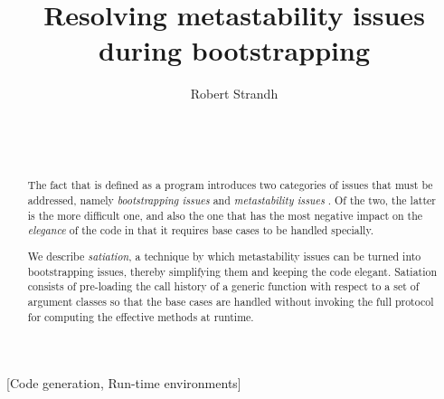 \documentclass{acm_proc_article-sp}
\def\inputtex#1{}
\begin{document}
\title{Resolving metastability issues during bootstrapping}
\author{\alignauthor
Robert Strandh\\
\\
\\
\\
}


\maketitle

\begin{abstract}
The fact that \clos{} is defined as a \clos{} program introduces two
categories of issues that must be addressed, namely
\emph{bootstrapping issues} and \emph{metastability issues}
\cite{Kiczales:1991:AMP:574212}.  Of the two, the latter is the more
difficult one, and also the one that has the most negative impact on
the \emph{elegance} of the code in that it requires base cases to be
handled specially.

We describe \emph{satiation}, a technique by which metastability
issues can be turned into bootstrapping issues, thereby simplifying
them and keeping the code elegant.  Satiation consists of pre-loading
the call history of a generic function with respect to a set of
argument classes so that the base cases are handled without invoking
the full protocol for computing the effective methods at runtime.
\end{abstract}

[Code generation, Run-time environments]

\inputtex{sec-introduction.tex}
\inputtex{sec-previous.tex}
\inputtex{sec-our-method.tex}
\inputtex{sec-conclusions.tex}



\end{document}
